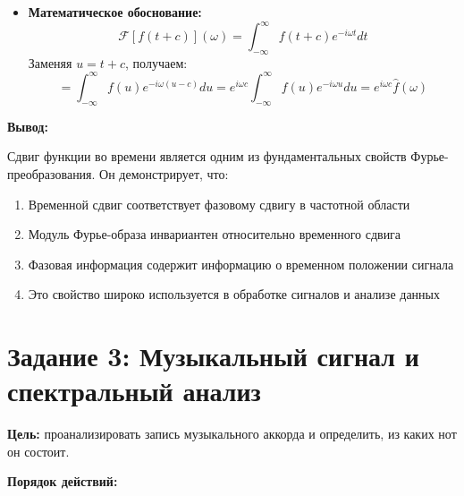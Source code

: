 \begin{itemize}
    \item \textbf{Математическое обоснование:}
    \[
    \mathcal{F}[f(t + c)](\omega) = \int_{-\infty}^{\infty} f(t + c) e^{-i \omega t} dt
    \]
    Заменяя $u = t + c$, получаем:
    \[
    = \int_{-\infty}^{\infty} f(u) e^{-i \omega (u - c)} du = e^{i \omega c} \int_{-\infty}^{\infty} f(u) e^{-i \omega u} du = e^{i \omega c} \hat{f}(\omega)
    \]
\end{itemize}

\textbf{Вывод:}

Сдвиг функции во времени является одним из фундаментальных свойств Фурье-преобразования. Он демонстрирует, что:

\begin{enumerate}
    \item Временной сдвиг соответствует фазовому сдвигу в частотной области
    \item Модуль Фурье-образа инвариантен относительно временного сдвига
    \item Фазовая информация содержит информацию о временном положении сигнала
    \item Это свойство широко используется в обработке сигналов и анализе данных
\end{enumerate}

\section*{Задание 3: Музыкальный сигнал и спектральный анализ}

\textbf{Цель:} проанализировать запись музыкального аккорда и определить, из каких нот он состоит.

\textbf{Порядок действий:}

